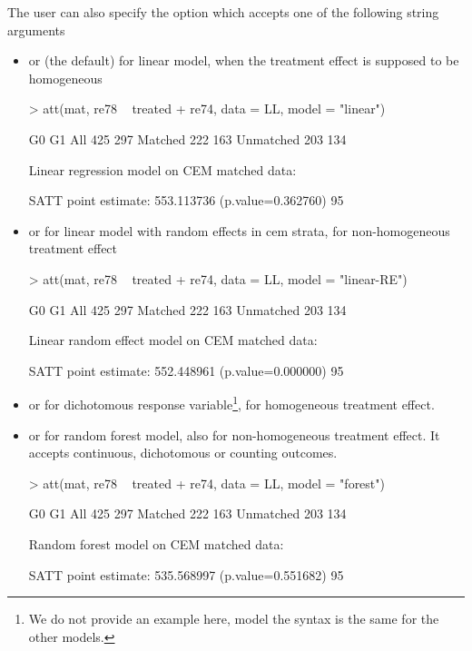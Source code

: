 \documentclass[article]{jss}
\begin{document}
The user can also specify the option  which accepts one of the following string arguments
\begin{itemize}
\item {} or  (the default) for linear model, when the treatment effect is supposed to be homogeneous
\begin{Schunk}
\begin{Sinput}
> att(mat, re78 ~ treated + re74, data = LL, model = "linear")
\end{Sinput}
\begin{Soutput}
           G0  G1
All       425 297
Matched   222 163
Unmatched 203 134

Linear regression model on CEM matched data:

SATT point estimate: 553.113736 (p.value=0.362760)
95%
\end{Soutput}
\end{Schunk}
\item {} or  for linear model with random effects in cem strata, for non-homogeneous treatment effect
\begin{Schunk}
\begin{Sinput}
> att(mat, re78 ~ treated + re74, data = LL, model = "linear-RE")
\end{Sinput}
\begin{Soutput}
           G0  G1
All       425 297
Matched   222 163
Unmatched 203 134

Linear random effect model on CEM matched data:

SATT point estimate: 552.448961 (p.value=0.000000)
95%
\end{Soutput}
\end{Schunk}
\item {} or  for dichotomous response variable\footnote{We do not provide an example here, model the syntax is the same for the other models.},  for homogeneous treatment effect. 
\item {} or  for random forest  model, also for non-homogeneous treatment effect. It accepts continuous, dichotomous or counting outcomes.
\begin{Schunk}
\begin{Sinput}
> att(mat, re78 ~ treated + re74, data = LL, model = "forest")
\end{Sinput}
\begin{Soutput}
           G0  G1
All       425 297
Matched   222 163
Unmatched 203 134

Random forest model on CEM matched data:

SATT point estimate: 535.568997 (p.value=0.551682)
95%
\end{Soutput}
\end{Schunk}
\end{itemize}
\end{document}
